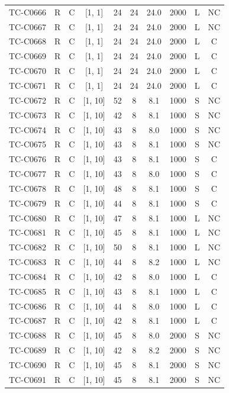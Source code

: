 \begin{longtable}{lccccccccc}
TC-C0666 & R & C & [1, 1] & 24 & 24 & 24.0 & 2000 & L & NC \\
TC-C0667 & R & C & [1, 1] & 24 & 24 & 24.0 & 2000 & L & NC \\
TC-C0668 & R & C & [1, 1] & 24 & 24 & 24.0 & 2000 & L & C \\
TC-C0669 & R & C & [1, 1] & 24 & 24 & 24.0 & 2000 & L & C \\
TC-C0670 & R & C & [1, 1] & 24 & 24 & 24.0 & 2000 & L & C \\
TC-C0671 & R & C & [1, 1] & 24 & 24 & 24.0 & 2000 & L & C \\
TC-C0672 & R & C & [1, 10] & 52 & 8 & 8.1 & 1000 & S & NC \\
TC-C0673 & R & C & [1, 10] & 42 & 8 & 8.1 & 1000 & S & NC \\
TC-C0674 & R & C & [1, 10] & 43 & 8 & 8.0 & 1000 & S & NC \\
TC-C0675 & R & C & [1, 10] & 43 & 8 & 8.1 & 1000 & S & NC \\
TC-C0676 & R & C & [1, 10] & 43 & 8 & 8.1 & 1000 & S & C \\
TC-C0677 & R & C & [1, 10] & 43 & 8 & 8.0 & 1000 & S & C \\
TC-C0678 & R & C & [1, 10] & 48 & 8 & 8.1 & 1000 & S & C \\
TC-C0679 & R & C & [1, 10] & 44 & 8 & 8.1 & 1000 & S & C \\
TC-C0680 & R & C & [1, 10] & 47 & 8 & 8.1 & 1000 & L & NC \\
TC-C0681 & R & C & [1, 10] & 45 & 8 & 8.1 & 1000 & L & NC \\
TC-C0682 & R & C & [1, 10] & 50 & 8 & 8.1 & 1000 & L & NC \\
TC-C0683 & R & C & [1, 10] & 44 & 8 & 8.2 & 1000 & L & NC \\
TC-C0684 & R & C & [1, 10] & 42 & 8 & 8.0 & 1000 & L & C \\
TC-C0685 & R & C & [1, 10] & 43 & 8 & 8.1 & 1000 & L & C \\
TC-C0686 & R & C & [1, 10] & 44 & 8 & 8.0 & 1000 & L & C \\
TC-C0687 & R & C & [1, 10] & 42 & 8 & 8.1 & 1000 & L & C \\
TC-C0688 & R & C & [1, 10] & 45 & 8 & 8.0 & 2000 & S & NC \\
TC-C0689 & R & C & [1, 10] & 42 & 8 & 8.2 & 2000 & S & NC \\
TC-C0690 & R & C & [1, 10] & 45 & 8 & 8.1 & 2000 & S & NC \\
TC-C0691 & R & C & [1, 10] & 45 & 8 & 8.1 & 2000 & S & NC \\

\end{longtable}

